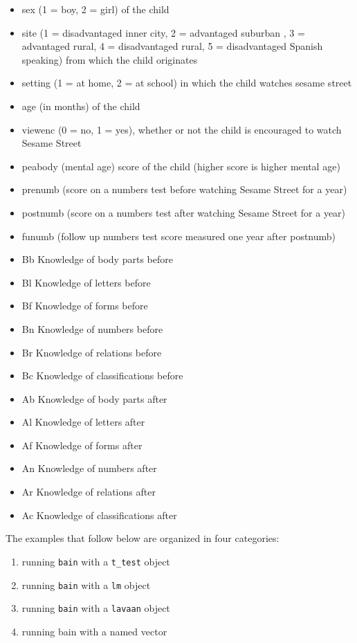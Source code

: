 \documentclass[
]{book}
\providecommand{\tightlist}{%
  \setlength{\itemsep}{0pt}\setlength{\parskip}{0pt}}
\begin{document}
\begin{itemize}
\tightlist
\item
  sex (1 = boy, 2 = girl) of the child
\item
  site (1 = disadvantaged inner city, 2 = advantaged suburban , 3 =
  advantaged rural,
  4 = disadvantaged rural, 5 = disadvantaged Spanish speaking) from which
  the child originates
\item
  setting (1 = at home, 2 = at school) in which the child watches sesame
  street
\item
  age (in months) of the child
\item
  viewenc (0 = no, 1 = yes), whether or not the child is encouraged to
  watch Sesame Street
\item
  peabody (mental age) score of the child (higher score is higher mental
  age)
\item
  prenumb (score on a numbers test before watching Sesame Street for a
  year)
\item
  postnumb (score on a numbers test after watching Sesame Street for a
  year)
\item
  funumb (follow up numbers test score measured one year after postnumb)
\item
  Bb Knowledge of body parts before
\item
  Bl Knowledge of letters before
\item
  Bf Knowledge of forms before
\item
  Bn Knowledge of numbers before
\item
  Br Knowledge of relations before
\item
  Bc Knowledge of classifications before
\item
  Ab Knowledge of body parts after
\item
  Al Knowledge of letters after
\item
  Af Knowledge of forms after
\item
  An Knowledge of numbers after
\item
  Ar Knowledge of relations after
\item
  Ac Knowledge of classifications after
\end{itemize}

The examples that follow below are organized in four categories:

\begin{enumerate}
\def\labelenumi{\arabic{enumi})}
\tightlist
\item
  running \texttt{bain} with a \texttt{t\_test} object
\item
  running \texttt{bain} with a \texttt{lm} object
\item
  running \texttt{bain} with a \texttt{lavaan} object
\item
  running bain with a named vector
\end{enumerate}
\end{document}
